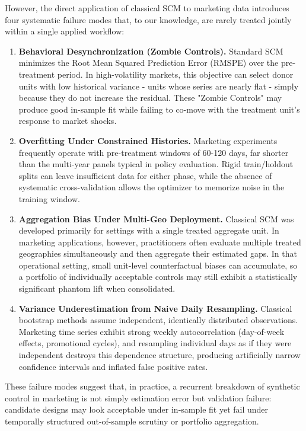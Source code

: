 \documentclass[11pt]{article}
\begin{document}
However, the direct application of classical SCM to marketing data introduces four systematic failure modes that, to our knowledge, are rarely treated jointly within a single applied workflow:

\begin{enumerate}
\item \textbf{Behavioral Desynchronization (Zombie Controls).} Standard SCM minimizes the Root Mean Squared Prediction Error (RMSPE) over the pre-treatment period. In high-volatility markets, this objective can select donor units with low historical variance - units whose series are nearly flat - simply because they do not increase the residual. These "Zombie Controls" may produce good in-sample fit while failing to co-move with the treatment unit's response to market shocks.
\item \textbf{Overfitting Under Constrained Histories.} Marketing experiments frequently operate with pre-treatment windows of 60-120 days, far shorter than the multi-year panels typical in policy evaluation. Rigid train/holdout splits can leave insufficient data for either phase, while the absence of systematic cross-validation allows the optimizer to memorize noise in the training window.
\item \textbf{Aggregation Bias Under Multi-Geo Deployment.} Classical SCM was developed primarily for settings with a single treated aggregate unit. In marketing applications, however, practitioners often evaluate multiple treated geographies simultaneously and then aggregate their estimated gaps. In that operational setting, small unit-level counterfactual biases can accumulate, so a portfolio of individually acceptable controls may still exhibit a statistically significant phantom lift when consolidated.
\item \textbf{Variance Underestimation from Naive Daily Resampling.} Classical bootstrap methods assume independent, identically distributed observations. Marketing time series exhibit strong weekly autocorrelation (day-of-week effects, promotional cycles), and resampling individual days as if they were independent destroys this dependence structure, producing artificially narrow confidence intervals and inflated false positive rates.
\end{enumerate}

These failure modes suggest that, in practice, a recurrent breakdown of synthetic control in marketing is not simply estimation error but validation failure: candidate designs may look acceptable under in-sample fit yet fail under temporally structured out-of-sample scrutiny or portfolio aggregation.
\end{document}
